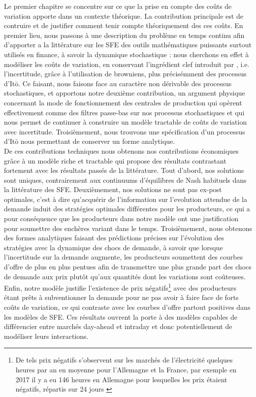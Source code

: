 Le premier chapitre se concentre sur ce que la prise en compte des coûts de variation apporte dans un contexte théorique. La contribution principale est de contruire et de justifier comment tenir compte théoriquement des ces coûts. En premier lieu, nous passons à une description du problème en temps continu afin d'apporter a la littérature sur les SFE des outils mathématiques puissants surtout utilisés en finance, à savoir la dynamique stochastique : nous cherchons en effet à modéliser les coûts de variation, en conservant l'ingrédient clef introduit par \cite{KM}, i.e. l'incertitude, grâce à l'utilisation de browniens, plus précisémment des processus d'It\={o}. Ce faisant, nous faisons face au caractère non dérivable des processus stochastiques, et apportons notre deuxième contribution, un argument physique concernant la mode de fonctionnement des centrales de production qui opèrent effectivement comme des filtres passe-bas sur nos processus stochastiques et qui nous permet de continuer à construire un modèle tractable de coûts de variation avec incertitude. Troisièmement, nous trouvons une spécification d'un processus d'It\={o} nous permettant de conserver un forme analytique. \\

De ces contributions techniques nous obtenons nos contributions économiques grâce à un modèle riche et tractable qui propose des résultats contrastant fortement avec les résultats passés de la littérature. Tout d'abord, nos solutions sont uniques, contrairement aux continuums d'équilibres de Nash habituels dans la littérature des SFE. Deuxièmement, nos solutions ne sont pas ex-post optimales, c'est à dire qu'acquérir de l'information sur l'evolution attendue de la demande induit des stratégies optimales différentes pour les producteurs, ce qui a pour conséquence que les producteurs dans notre modèle ont une justification pour soumettre des enchères variant dans le temps. Troisièmement, nous obtenons des formes analytiques faisant des prédictions précises sur l'évolution des stratégies avec la dynamique des chocs de demande, à savoir que lorsque l'incertitude sur la demande augmente, les producteurs soumettent des courbes d'offre de plus en plus pentues afin de transmettre une plus grande part des chocs de demande aux prix plutôt qu'aux quantités dont les variations sont coûteuses. Enfin, notre modèle justifie l'existence de prix négatifs\footnote{De tels prix négatifs s'observent sur les marchés de l'électricité quelques heures par an en moyenne pour l'Allemagne et la France, par exemple en 2017 il y a eu 146 heures en Allemagne pour lesquelles les prix étaient négatifs, répartis sur 24 jours \cite{epexnegP}} avec des producteurs étant prêts à subventionner la demande pour ne pas avoir à faire face de forts coûts de variation, ce qui contraste avec les courbes d'offre partout positives dans les modèles de SFE. Ces résultats ouvrent la porte à des modèles capables de différencier entre marchés day-ahead et intraday et donc potentiellement de modéliser leurs interactions.\\

